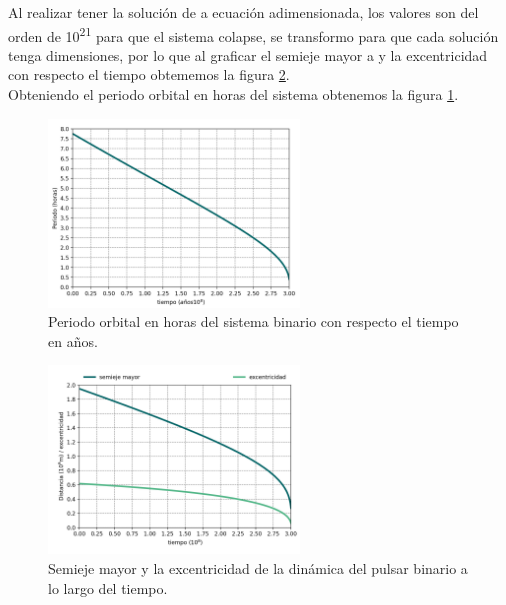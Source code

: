 Al realizar tener la solución de a ecuación adimensionada, los valores son del orden de 10\textsuperscript{21} para que el sistema 
colapse, se transformo para que cada solución tenga dimensiones, por lo que al graficar el semieje mayor a y la excentricidad con respecto el tiempo obtememos la figura
\ref{fig:semieje,excentricidad}.\\
Obteniendo el periodo orbital en horas del sistema obtenemos la figura \ref{fig:periodo}.\\
\begin{minipage}{0.45\linewidth}
    \begin{figure}[H]
        \centering
        \includegraphics[height=5cm]{images/periodo.png}
        \caption{Periodo orbital en horas del sistema binario con respecto el tiempo en años.}
        \label{fig:periodo}
    \end{figure}
\end{minipage}
\hspace{0.5cm}
\begin{minipage}{0.50\linewidth}
    \begin{figure}[H]
        \centering
        \includegraphics[height=5cm]{images/a_adim.png}
        \caption{Semieje mayor y la excentricidad de la dinámica del pulsar binario a lo largo del tiempo.}
        \label{fig:semieje,excentricidad}
    \end{figure} 
\end{minipage}\\\\

